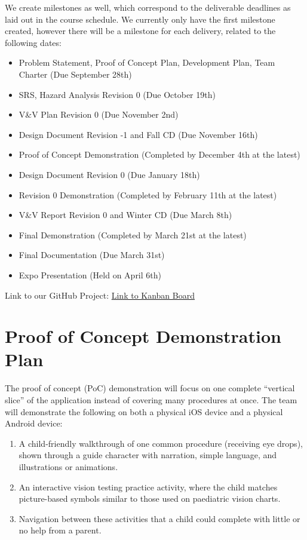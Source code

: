 \documentclass{article}
\begin{document}
We create milestones as well, which correspond to the deliverable deadlines as laid out in the course schedule.
We currently only have the first milestone created, however there will be a milestone for each delivery, related to the following dates:

{\setlength{\leftmargini}{4em}
\begin{itemize}
  \item[\textbf{M1:}] Problem Statement, Proof of Concept Plan, Development Plan, Team Charter (Due September 28th)
  \item[\textbf{M2:}] SRS, Hazard Analysis Revision 0 (Due October 19th)
  \item[\textbf{M3:}] V\&V Plan Revision 0 (Due November 2nd)
  \item[\textbf{M4:}] Design Document Revision -1 and Fall CD (Due November 16th)
  \item[\textbf{M5:}] Proof of Concept Demonstration (Completed by December 4th at the latest)
  \item[\textbf{M6:}] Design Document Revision 0 (Due January 18th)
  \item[\textbf{M7:}] Revision 0 Demonstration (Completed by February 11th at the latest)
  \item[\textbf{M8:}] V\&V Report Revision 0 and Winter CD (Due March 8th)
  \item[\textbf{M9:}] Final Demonstration (Completed by March 21st at the latest)
  \item[\textbf{M10:}] Final Documentation (Due March 31st)
  \item[\textbf{M11:}] Expo Presentation (Held on April 6th)
\end{itemize}
}

Link to our GitHub Project: \href{https://github.com/orgs/team-hindsight/projects/1/views/2}{Link to Kanban Board}

\section{Proof of Concept Demonstration Plan}

The proof of concept (PoC) demonstration will focus on one complete ``vertical
slice'' of the application instead of covering many procedures at once. The team
will demonstrate the following on both a physical iOS device and a physical
Android device:

\begin{enumerate}
  \item A child-friendly walkthrough of one common procedure (receiving eye
  drops), shown through a guide character with narration, simple language, and
  illustrations or animations.
  \item An interactive vision testing practice activity, where the child matches
  picture-based symbols similar to those used on paediatric vision charts.
  \item Navigation between these activities that a child could complete with
  little or no help from a parent.
\end{enumerate}
\end{document}
